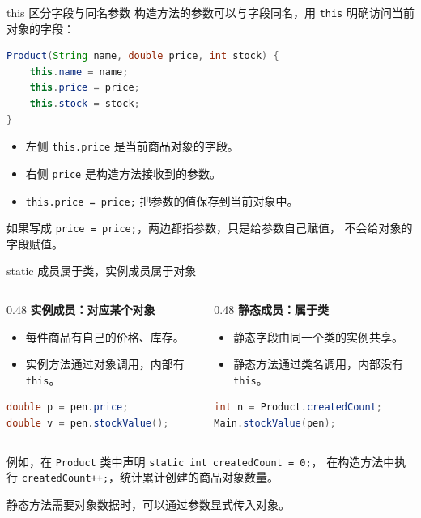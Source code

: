 \documentclass[aspectratio=169]{beamer}
\begin{document}
\begin{frame}[fragile]{this 区分字段与同名参数}
  构造方法的参数可以与字段同名，用 \texttt{this} 明确访问当前对象的字段：
  \begin{lstlisting}[language=Java]
Product(String name, double price, int stock) {
    this.name = name;
    this.price = price;
    this.stock = stock;
}
  \end{lstlisting}
  \begin{itemize}
    \item 左侧 \texttt{this.price} 是当前商品对象的字段。
    \item 右侧 \texttt{price} 是构造方法接收到的参数。
    \item \texttt{this.price = price;} 把参数的值保存到当前对象中。
  \end{itemize}
  \medskip
  如果写成 \texttt{price = price;}，两边都指参数，只是给参数自己赋值，
  \alert{不会给对象的字段赋值}。
\end{frame}

\begin{frame}[fragile]{static 成员属于类，实例成员属于对象}
  \begin{columns}[T,onlytextwidth]
    \begin{column}{0.48\textwidth}
      \textbf{实例成员：对应某个对象}
      \begin{itemize}
        \item 每件商品有自己的价格、库存。
        \item 实例方法通过对象调用，内部有 \texttt{this}。
      \end{itemize}
      \begin{lstlisting}[language=Java]
double p = pen.price;
double v = pen.stockValue();
      \end{lstlisting}
    \end{column}
    \begin{column}{0.48\textwidth}
      \textbf{静态成员：属于类}
      \begin{itemize}
        \item 静态字段由同一个类的实例共享。
        \item 静态方法通过类名调用，内部没有 \texttt{this}。
      \end{itemize}
      \begin{lstlisting}[language=Java]
int n = Product.createdCount;
Main.stockValue(pen);
      \end{lstlisting}
    \end{column}
  \end{columns}
  \medskip
  例如，在 \texttt{Product} 类中声明 \texttt{static int createdCount = 0;}，
  在构造方法中执行 \texttt{createdCount++;}，统计累计创建的商品对象数量。
  \par\medskip
  静态方法需要对象数据时，可以\alert{通过参数显式传入对象}。
\end{frame}
\end{document}
